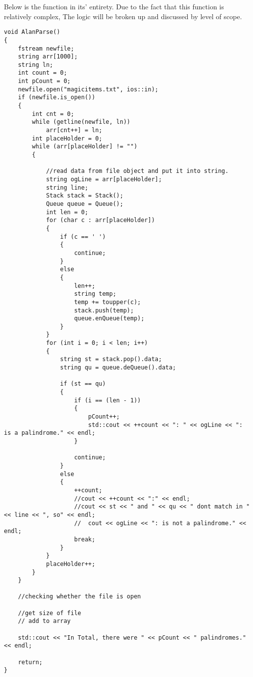 \documentclass[letterpaper, 10pt]{article}
\begin{document}
Below is the function in its' entirety. Due to the fact that this function is relatively complex, The logic will be broken up and discussed by level of scope.
\begin{addmargin}[-10em]{1em}
\begin{small}
\begin{verbatim}
void AlanParse()
{
	fstream newfile;
	string arr[1000];
	string ln;
	int count = 0;
	int pCount = 0;
	newfile.open("magicitems.txt", ios::in);
	if (newfile.is_open())
	{
		int cnt = 0;
		while (getline(newfile, ln))
			arr[cnt++] = ln;
		int placeHolder = 0;
		while (arr[placeHolder] != "")
		{

			//read data from file object and put it into string.
			string ogLine = arr[placeHolder];
			string line;
			Stack stack = Stack();
			Queue queue = Queue();
			int len = 0;
			for (char c : arr[placeHolder])
			{
				if (c == ' ')
				{
					continue;
				}
				else
				{
					len++;
					string temp;
					temp += toupper(c);
					stack.push(temp);
					queue.enQueue(temp);
				}
			}
			for (int i = 0; i < len; i++)
			{
				string st = stack.pop().data;
				string qu = queue.deQueue().data;

				if (st == qu)
				{
					if (i == (len - 1))
					{
						pCount++;
						std::cout << ++count << ": " << ogLine << ": is a palindrome." << endl;
					}

					continue;
				}
				else
				{
					++count;
					//cout << ++count << ":" << endl;
					//cout << st << " and " << qu << " dont match in " << line << ", so" << endl;
					//	cout << ogLine << ": is not a palindrome." << endl;
					break;
				}
			}
			placeHolder++;
		}
	}

	//checking whether the file is open

	//get size of file
	// add to array

	std::cout << "In Total, there were " << pCount << " palindromes." << endl;

	return;
}
\end{verbatim}
\end{small}
\end{addmargin}
\newpage
\end{document}
